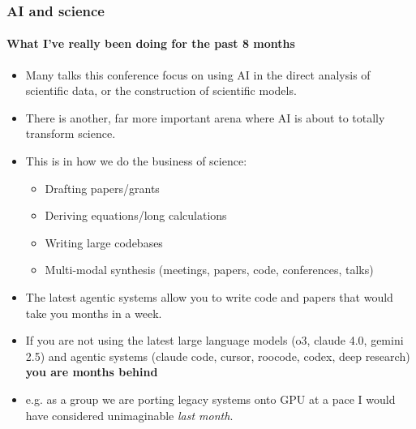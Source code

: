 \documentclass[aspectratio=169]{beamer}
\begin{document}
\begin{frame}
    \frametitle{AI and science}
    \framesubtitle{What I've really been doing for the past 8 months}
    \begin{itemize}
        \item Many talks this conference focus on using AI in the direct analysis of scientific data, or the construction of scientific models.
        \item There is another, far more important arena where AI is about to totally transform science.
        \item This is in how we do the business of science:
            \begin{itemize}
                \item Drafting papers/grants
                \item Deriving equations/long calculations
                \item Writing large codebases
                \item Multi-modal synthesis (meetings, papers, code, conferences, talks)
            \end{itemize}
        \item The latest agentic systems allow you to write code and papers that would take you months in a week.
        \item If you are not using the latest large language models (o3, claude 4.0, gemini 2.5) and agentic systems (claude code, cursor, roocode, codex, deep research) \textbf{you are months behind}
        \item e.g. as a group we are porting legacy systems onto GPU at a pace I would have considered unimaginable \textit{last month}.
    \end{itemize}
\end{frame}
\end{document}
